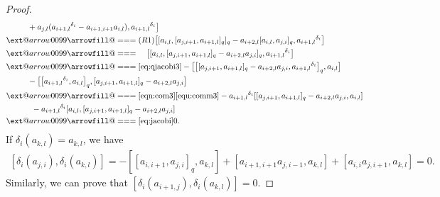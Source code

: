 \documentclass[10pt,a4paper]{amsart}
\makeatletter
\def\x@arrow{\DOTSB\Relbar}
\def\xlongequalsignfill@{\arrowfill@\x@arrow\Relbar\x@arrow}
\providecommand{\xlongequal}[2][]{%
	\ext@arrow 0099\xlongequalsignfill@{#1}{#2}}
\numberwithin{equation}{section}
\def\lr#1{\left[#1\right]}
\def\lrb#1{\left(#1\right)}
\def\d{\delta}
\makeatother
\begin{document}
\begin{proof}
\begin{align*}
&\qquad \ \ +a_{j,l} ({a_{i+1,l}}^{\d_i}-a_{i+1,i+1}a_{i,l} ), {a_{i+1,l}}^{\d_i} \bigr] \\
& \xlongequal{(R1)} \bigl[ [a_{i,l}, [a_{j,i+1}, a_{i+1,l} ]_q ]_q-a_{i+2,l} [a_{i,l}, a_{j,i} ]_q, {a_{i+1,l}}^{\d_i} \bigr] \\
 & \xlongequal{\quad} \bigl[ [a_{i,l}, [a_{j,i+1}, a_{i+1,l} ]_q -a_{i+2,l}a_{j,i} ]_q, {a_{i+1,l}}^{\d_i} \bigr] \\
& \xlongequal{\eqref{eq:qjacobi3}} - \bigl[ \bigl[ [a_{j,i+1}, a_{i+1,l} ]_q -a_{i+2,l}a_{j,i}, {a_{i+1,l}}^{\d_i} \bigr]_q, a_{i,l} \bigr] \\
& \qquad\ \ - \bigl[ \bigl[{a_{i+1,l}}^{\d_i} , a_{i,l} \bigr]_q, [a_{j,i+1}, a_{i+1,l} ]_q -a_{i+2,l}a_{j,i} \bigr] \\
 &\xlongequal[\eqref{eqn:com3}]{\eqref{equ:comm3}} -{a_{i+1,l}}^{\d_i} [ [a_{j,i+1}, a_{i+1,l} ]_q -a_{i+2,l}a_{j,i}, a_{i,l} ]\\
 &\qquad\quad\, -{a_{i+1,l}}^{\d_i} [a_{i,l}, [a_{j,i+1}, a_{i+1,l} ]_q -a_{i+2,l}a_{j,i} ] \\
& \xlongequal{\eqref{eq:jacobi}} 0.
 \end{align*}
 If $\d_i(a_{k,l})=a_{k,l}$, we have
\begin{eqnarray*}
\lr{\d_i\lrb{a_{j,i}}, \d_i\lrb{a_{k,l}}}
=-[\lr{a_{i,i+1}, a_{j,i}}_q, a_{k,l}]+\lr{a_{i+1,i+1}a_{j,i-1}, a_{k,l}}+\lr{a_{i,i}a_{j,i+1}, a_{k,l}}=0.
 \end{eqnarray*}
Similarly, we can prove that
$
\lr{\d_i\lrb{a_{i+1,j}}, \d_i\lrb{a_{k,l}}}=0$.


\end{proof}
\end{document}
